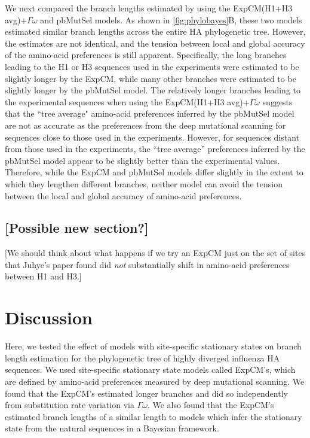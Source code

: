 \documentclass[11pt]{article}
\newcommand\jdbcomment[1]{{\color{red}[#1]}}
\begin{document}
We next compared the branch lengths estimated by using the ExpCM(H1+H3 avg)+$\Gamma\omega$ and pbMutSel models.
As shown in \ref{fig:phylobayes}B, these two models estimated similar branch lengths across the entire HA phylogenetic tree. 
However, the estimates are not identical, and the tension between local and global accuracy of the amino-acid preferences is still apparent. 
Specifically, the long branches leading to the H1 or H3 sequences used in the experiments were estimated to be slightly longer by the ExpCM, while many other branches were estimated to be slightly longer by the pbMutSel model. 
The relatively longer branches leading to the experimental sequences when using the ExpCM(H1+H3 avg)+$\Gamma\omega$ suggests that the ``tree average" amino-acid preferences inferred by the pbMutSel model are not as accurate as the preferences from the deep mutational scanning for sequences close to those used in the experiments. 
However, for sequences distant from those used in the experiments, the ``tree average'' preferences inferred by the pbMutSel model appear to be slightly better than the experimental values.
Therefore, while the ExpCM and pbMutSel models differ slightly in the extent to which they lengthen different branches, neither model can avoid the tension between the local and global accuracy of amino-acid preferences. 

\subsection*{\jdbcomment{Possible new section?}}
\jdbcomment{We should think about what happens if we try an ExpCM just on the set of sites that Juhye's paper found did \emph{not} substantially shift in amino-acid preferences between H1 and H3.}

\section*{Discussion}

Here, we tested the effect of models with site-specific stationary states on branch length estimation for the phylogenetic tree of highly diverged influenza HA sequences. 
We used site-specific stationary state models called ExpCM's, which are defined by amino-acid preferences measured by deep mutational scanning. 
We found that the ExpCM's estimated longer branches and did so independently from substitution rate variation via $\Gamma\omega$. 
We also found that the ExpCM's estimated branch lengths of a similar length to models which infer the stationary state from the natural sequences in a Bayesian framework.  
\end{document}
